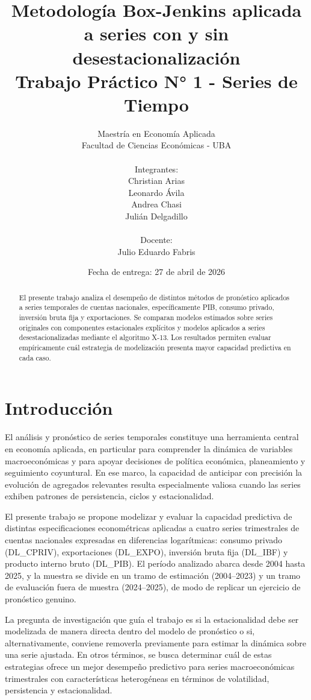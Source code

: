 \documentclass[11pt]{article}
\title{%
\textbf{Metodología Box-Jenkins aplicada a series con y sin desestacionalización} \\
\large Trabajo Práctico N° 1 - Series de Tiempo
}
\author{
Maestría en Economía Aplicada \\
Facultad de Ciencias Económicas - UBA \\
\\
Integrantes: \\
Christian Arias \\
Leonardo Ávila \\
Andrea Chasi \\
Julián Delgadillo \\
\\
Docente: \\
Julio Eduardo Fabris
}
\date{Fecha de entrega: 27 de abril de 2026}
\begin{document}
\maketitle

\begin{abstract}
El presente trabajo analiza el desempeño de distintos métodos de pronóstico aplicados a series temporales de cuentas nacionales, específicamente PIB, consumo privado, inversión bruta fija y exportaciones. Se comparan modelos estimados sobre series originales con componentes estacionales explícitos y modelos aplicados a series desestacionalizadas mediante el algoritmo X-13. Los resultados permiten evaluar empíricamente cuál estrategia de modelización presenta mayor capacidad predictiva en cada caso.
\end{abstract}

\section{Introducción}

El análisis y pronóstico de series temporales constituye una herramienta central en economía aplicada, en particular para comprender la dinámica de variables macroeconómicas y para apoyar decisiones de política económica, planeamiento y seguimiento coyuntural. En ese marco, la capacidad de anticipar con precisión la evolución de agregados relevantes resulta especialmente valiosa cuando las series exhiben patrones de persistencia, ciclos y estacionalidad.

El presente trabajo se propone modelizar y evaluar la capacidad predictiva de distintas especificaciones econométricas aplicadas a cuatro series trimestrales de cuentas nacionales expresadas en diferencias logarítmicas: consumo privado (DL\_CPRIV), exportaciones (DL\_EXPO), inversión bruta fija (DL\_IBF) y producto interno bruto (DL\_PIB). El período analizado abarca desde 2004 hasta 2025, y la muestra se divide en un tramo de estimación (2004–2023) y un tramo de evaluación fuera de muestra (2024–2025), de modo de replicar un ejercicio de pronóstico genuino.

La pregunta de investigación que guía el trabajo es si la estacionalidad debe ser modelizada de manera directa dentro del modelo de pronóstico o si, alternativamente, conviene removerla previamente para estimar la dinámica sobre una serie ajustada. En otros términos, se busca determinar cuál de estas estrategias ofrece un mejor desempeño predictivo para series macroeconómicas trimestrales con características heterogéneas en términos de volatilidad, persistencia y estacionalidad.
\end{document}
